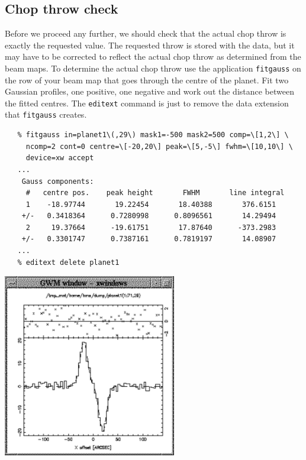 \documentclass[11pt]{article}
\newcommand{\htmladdimg}[1]{}
\newenvironment{latexonly}{}{}
\newcommand{\htmlref}[2]{#1}
\newcommand{\xref}[3]{#1}
\newcommand{\xlabel}[1]{}
\begin{document}
\subsection{\label{throwchk}\xlabel{throwchk}Chop throw check}

   Before we proceed any further, we should check that the actual
\htmlref{chop throw}{glosschopthrow}
   is exactly the requested value. The requested throw is stored with
   the data, but it may have to be corrected to reflect the actual
   chop throw as determined from the
\htmlref{beam maps.}{glossbeammap}
   To determine the actual chop throw use the application
{\tt \xref{fitgauss}{sun140}{FITGAUSS}}
   on the row of your beam map that goes through the centre of the
   planet. Fit two Gaussian profiles, one positive, one negative and
   work out the distance between the fitted centres. The
{\tt \xref{editext}{sun140}{EDITEXT}}
   command is just to remove the data extension that {\tt fitgauss}
   creates.

\begin{verbatim}
   % fitgauss in=planet1\(,29\) mask1=-500 mask2=500 comp=\[1,2\] \
     ncomp=2 cont=0 centre=\[-20,20\] peak=\[5,-5\] fwhm=\[10,10\] \
     device=xw accept
   ...
    Gauss components:
     #   centre pos.    peak height       FWHM       line integral
     1    -18.97744       19.22454       18.40388       376.6151
    +/-   0.3418364      0.7280998      0.8096561       14.29494
     2     19.37664      -19.61751       17.87640      -373.2983
    +/-   0.3301747      0.7387161      0.7819197       14.08907
   ...
   % editext delete planet1
\end{verbatim}

\begin{latexonly}
\begin{center}
\leavevmode\includegraphics[height=80mm]{sc1_fitgauss}
\end{center}
\end{latexonly}
\htmladdimg{addon/fitgauss.gif}
\end{document}
